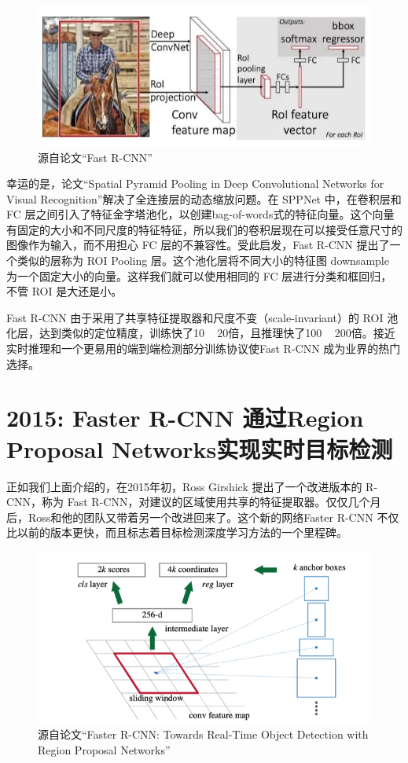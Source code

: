 \documentclass{article}
\begin{document}
	   	\begin{figure}[htpb]
	   		\centering
	   		\includegraphics[width=\linewidth]{detectfig/2.jpg}
	   		\caption{源自论文“Fast R-CNN”}
	   	\end{figure}
	   	幸运的是，论文“Spatial Pyramid Pooling in Deep Convolutional Networks for Visual Recognition”解决了全连接层的动态缩放问题。在 SPPNet 中，在卷积层和 FC 层之间引入了特征金字塔池化，以创建bag-of-words式的特征向量。这个向量有固定的大小和不同尺度的特征特征，所以我们的卷积层现在可以接受任意尺寸的图像作为输入，而不用担心 FC 层的不兼容性。受此启发，Fast R-CNN 提出了一个类似的层称为 ROI Pooling 层。这个池化层将不同大小的特征图 downsample 为一个固定大小的向量。这样我们就可以使用相同的 FC 层进行分类和框回归，不管 ROI 是大还是小。
	   	
	   	Fast R-CNN 由于采用了共享特征提取器和尺度不变（scale-invariant）的 ROI 池化层，达到类似的定位精度，训练快了10 ~ 20倍，且推理快了100 ~ 200倍。接近实时推理和一个更易用的端到端检测部分训练协议使Fast R-CNN 成为业界的热门选择。
	   	
	   	\section{2015: Faster R-CNN 通过Region Proposal Networks实现实时目标检测}
	   	正如我们上面介绍的，在2015年初，Ross Girshick 提出了一个改进版本的 R-CNN，称为 Fast R-CNN，对建议的区域使用共享的特征提取器。仅仅几个月后，Ross和他的团队又带着另一个改进回来了。这个新的网络Faster R-CNN 不仅比以前的版本更快，而且标志着目标检测深度学习方法的一个里程碑。
	   	
	   	\begin{figure}[htpb]
	   		\centering
	   		\includegraphics[width=\linewidth]{detectfig/3.png}
	   		\caption{源自论文“Faster R-CNN: Towards Real-Time Object Detection with Region Proposal Networks”}
	   	\end{figure}
   	
\end{document}
